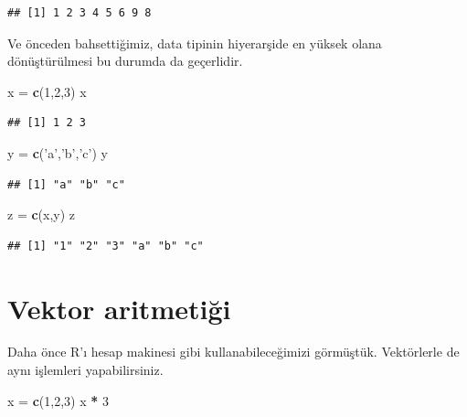 \documentclass[]{book}
\newenvironment{Shaded}{\begin{snugshade}}{\end{snugshade}}
\newcommand{\DecValTok}[1]{\textcolor[rgb]{0.00,0.00,0.81}{#1}}
\newcommand{\KeywordTok}[1]{\textcolor[rgb]{0.13,0.29,0.53}{\textbf{#1}}}
\newcommand{\NormalTok}[1]{#1}
\newcommand{\OperatorTok}[1]{\textcolor[rgb]{0.81,0.36,0.00}{\textbf{#1}}}
\newcommand{\StringTok}[1]{\textcolor[rgb]{0.31,0.60,0.02}{#1}}
\begin{document}
\begin{verbatim}
## [1] 1 2 3 4 5 6 9 8
\end{verbatim}

Ve önceden bahsettiğimiz, data tipinin hiyerarşide en yüksek olana
dönüştürülmesi bu durumda da geçerlidir.

\begin{Shaded}
\begin{Highlighting}[]
\NormalTok{x =}\StringTok{ }\KeywordTok{c}\NormalTok{(}\DecValTok{1}\NormalTok{,}\DecValTok{2}\NormalTok{,}\DecValTok{3}\NormalTok{)}
\NormalTok{x}
\end{Highlighting}
\end{Shaded}

\begin{verbatim}
## [1] 1 2 3
\end{verbatim}

\begin{Shaded}
\begin{Highlighting}[]
\NormalTok{y =}\StringTok{ }\KeywordTok{c}\NormalTok{(}\StringTok{'a'}\NormalTok{,}\StringTok{'b'}\NormalTok{,}\StringTok{'c'}\NormalTok{)}
\NormalTok{y}
\end{Highlighting}
\end{Shaded}

\begin{verbatim}
## [1] "a" "b" "c"
\end{verbatim}

\begin{Shaded}
\begin{Highlighting}[]
\NormalTok{z =}\StringTok{ }\KeywordTok{c}\NormalTok{(x,y)}
\NormalTok{z}
\end{Highlighting}
\end{Shaded}

\begin{verbatim}
## [1] "1" "2" "3" "a" "b" "c"
\end{verbatim}

\hypertarget{vektor-aritmetigi}{%
\section{Vektor aritmetiği}\label{vektor-aritmetigi}}

Daha önce R'ı hesap makinesi gibi kullanabileceğimizi görmüştük.
Vektörlerle de aynı işlemleri yapabilirsiniz.

\begin{Shaded}
\begin{Highlighting}[]
\NormalTok{x =}\StringTok{ }\KeywordTok{c}\NormalTok{(}\DecValTok{1}\NormalTok{,}\DecValTok{2}\NormalTok{,}\DecValTok{3}\NormalTok{)}
\NormalTok{x }\OperatorTok{*}\StringTok{ }\DecValTok{3}
\end{Highlighting}
\end{Shaded}
\end{document}
